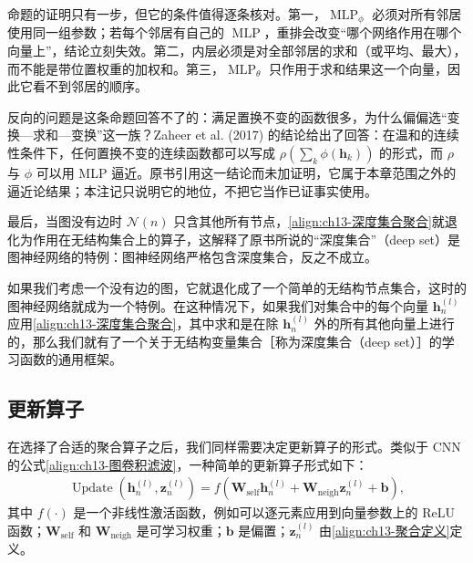 \documentclass[../../main.tex]{subfiles}
\begin{document}
\begin{remark}
命题的证明只有一步，但它的条件值得逐条核对。第一，$\operatorname{MLP}_\phi$ 必须对所有邻居使用同一组参数；若每个邻居有自己的 $\operatorname{MLP}$，重排会改变“哪个网络作用在哪个向量上”，结论立刻失效。第二，内层必须是对全部邻居的求和（或平均、最大），而不能是带位置权重的加权和。第三，$\operatorname{MLP}_\theta$ 只作用于求和结果这一个向量，因此它看不到邻居的顺序。\par
反向的问题是这条命题回答不了的：满足置换不变的函数很多，为什么偏偏选“变换—求和—变换”这一族？Zaheer et al. (2017) 的结论给出了回答：在温和的连续性条件下，任何置换不变的连续函数都可以写成 $\rho\left(\sum_k\phi(\bm{h}_k)\right)$ 的形式，而 $\rho$ 与 $\phi$ 可以用 MLP 逼近。原书引用这一结论而未加证明，它属于本章范围之外的逼近论结果；本注记只说明它的地位，不把它当作已证事实使用。\par
最后，当图没有边时 $\mathcal{N}(n)$ 只含其他所有节点，\eqref{align:ch13-深度集合聚合}就退化为作用在无结构集合上的算子，这解释了原书所说的“深度集合”（deep set）是图神经网络的特例：图神经网络严格包含深度集合，反之不成立。
\end{remark}

如果我们考虑一个没有边的图，它就退化成了一个简单的无结构节点集合，这时的图神经网络就成为一个特例。在这种情况下，如果我们对集合中的每个向量 $\bm{h}_n^{(l)}$ 应用\eqref{align:ch13-深度集合聚合}，其中求和是在除 $\bm{h}_n^{(l)}$ 外的所有其他向量上进行的，那么我们就有了一个关于无结构变量集合［称为深度集合（deep set）］的学习函数的通用框架。

\subsection{更新算子}\label{subsection:ch13-更新算子}

在选择了合适的聚合算子之后，我们同样需要决定更新算子的形式。类似于 CNN 的公式\eqref{align:ch13-图卷积滤波}，一种简单的更新算子形式如下：
\begin{align}
\operatorname{Update}\!\left(\bm{h}_n^{(l)},\bm{z}_n^{(l)}\right)=f\!\left(\bm{W}_{\mathrm{self}}\bm{h}_n^{(l)}+\bm{W}_{\mathrm{neigh}}\bm{z}_n^{(l)}+\bm{b}\right),
\label{align:ch13-更新算子}
\end{align}
其中 $f(\cdot)$ 是一个非线性激活函数，例如可以逐元素应用到向量参数上的 ReLU 函数；$\bm{W}_{\mathrm{self}}$ 和 $\bm{W}_{\mathrm{neigh}}$ 是可学习权重；$\bm{b}$ 是偏置；$\bm{z}_n^{(l)}$ 由\eqref{align:ch13-聚合定义}定义。
\end{document}
